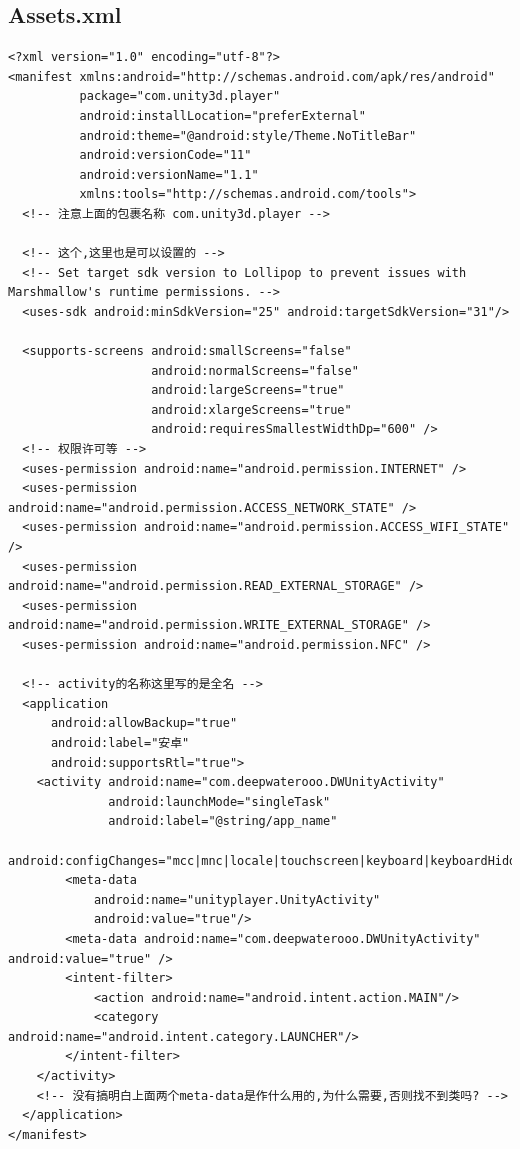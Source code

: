 \documentclass[9pt, b5paper]{article}
\begin{document}
\subsection{Assets\Plugins\Android\AnddroidManifest.xml}
\label{sec-5-8}
\begin{verbatim}
<?xml version="1.0" encoding="utf-8"?>
<manifest xmlns:android="http://schemas.android.com/apk/res/android"
          package="com.unity3d.player"
          android:installLocation="preferExternal"
          android:theme="@android:style/Theme.NoTitleBar"
          android:versionCode="11"
          android:versionName="1.1"
          xmlns:tools="http://schemas.android.com/tools">
  <!-- 注意上面的包裹名称 com.unity3d.player -->

  <!-- 这个,这里也是可以设置的 -->
  <!-- Set target sdk version to Lollipop to prevent issues with Marshmallow's runtime permissions. -->
  <uses-sdk android:minSdkVersion="25" android:targetSdkVersion="31"/>

  <supports-screens android:smallScreens="false"
                    android:normalScreens="false"
                    android:largeScreens="true"
                    android:xlargeScreens="true"
                    android:requiresSmallestWidthDp="600" />
  <!-- 权限许可等 -->
  <uses-permission android:name="android.permission.INTERNET" />
  <uses-permission android:name="android.permission.ACCESS_NETWORK_STATE" />
  <uses-permission android:name="android.permission.ACCESS_WIFI_STATE" /> 
  <uses-permission android:name="android.permission.READ_EXTERNAL_STORAGE" />
  <uses-permission android:name="android.permission.WRITE_EXTERNAL_STORAGE" />
  <uses-permission android:name="android.permission.NFC" />

  <!-- activity的名称这里写的是全名 -->
  <application
      android:allowBackup="true"
      android:label="安卓"
      android:supportsRtl="true">
    <activity android:name="com.deepwaterooo.DWUnityActivity"
              android:launchMode="singleTask"
			  android:label="@string/app_name"
			  android:configChanges="mcc|mnc|locale|touchscreen|keyboard|keyboardHidden|navigation|orientation|screenLayout|uiMode|screenSize|smallestScreenSize|fontScale">
        <meta-data
            android:name="unityplayer.UnityActivity"
            android:value="true"/>
        <meta-data android:name="com.deepwaterooo.DWUnityActivity" android:value="true" />
        <intent-filter>
            <action android:name="android.intent.action.MAIN"/>
            <category android:name="android.intent.category.LAUNCHER"/>
        </intent-filter>
    </activity>
    <!-- 没有搞明白上面两个meta-data是作什么用的,为什么需要,否则找不到类吗? -->
  </application>
</manifest>
\end{verbatim}
\end{document}
